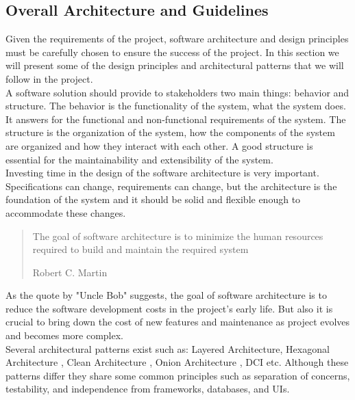 \begin{spacing}{1.2}
    \section{Overall Architecture and Guidelines}
    Given the requirements of the project, software architecture and design principles must be carefully chosen to ensure the success of the project.
    In this section we will present some of the design principles and architectural patterns that we will follow in the project.
    \\

    A software solution should provide to stakeholders two main things: behavior and structure.
    The behavior is the functionality of the system, what the system does. It answers for the functional and non-functional requirements of the system.
    The structure is the organization of the system, how the components of the system are organized and how they interact with each other.
    A good structure is essential for the maintainability and extensibility of the system.
    \\

    Investing time in the design of the software architecture is very important. Specifications can change, requirements can change, but the architecture is the foundation of the system and
    it should be solid and flexible enough to accommodate these changes.
    \begin{quote}
        The goal of software architecture is to minimize the human resources required to build and maintain the required system
        \begin{flushright}
            Robert C. Martin \cite{clean}
        \end{flushright}

    \end{quote}

    As the quote by "Uncle Bob" suggests, the goal of software architecture is to reduce the software development costs in the project's early life. But also it is
    crucial to bring down the cost of new features and maintenance as project evolves and becomes more complex.
    \\

    Several architectural patterns exist such as: Layered Architecture, Hexagonal Architecture \cite{freeman2009growing}, Clean Architecture \cite{clean}, Onion Architecture \cite{Onion}, DCI \cite{dci} etc.
    Although these patterns differ they share some common principles such as separation of concerns, testability, and independence from frameworks, databases, and UIs.
    \\


\end{spacing}

